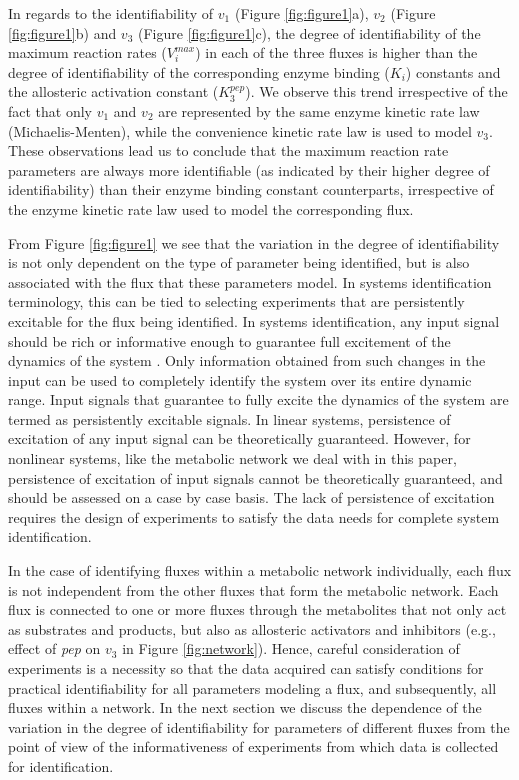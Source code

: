 \documentclass[10pt]{article}
\begin{document}
	In regards to the identifiability of $v_1$ (Figure \ref{fig:figure1}a), $v_2$ (Figure \ref{fig:figure1}b) and $v_3$ (Figure \ref{fig:figure1}c), the degree of identifiability of the maximum reaction rates ($V_i^{max}$) in each of the three fluxes is higher than the degree of identifiability of the corresponding enzyme binding ($K_i$) constants and the allosteric activation constant ($K_3^{pep}$). We observe this trend irrespective of the fact that only  $v_1$ and $v_2$ are represented by the same enzyme kinetic rate law (Michaelis-Menten), while the convenience kinetic rate law is used to model $v_3$. These observations lead us to conclude that the maximum reaction rate parameters are always more identifiable (as indicated by their higher degree of identifiability) than their enzyme binding constant counterparts, irrespective of the enzyme kinetic rate law used to model the corresponding flux.
	
	From Figure \ref{fig:figure1} we see that the variation in the degree of identifiability is not only dependent on the type of parameter being identified, but is also associated with the flux that these parameters model.	In systems identification terminology, this can be tied to selecting experiments that are persistently excitable for the flux being identified. In systems identification, any input signal should be rich or informative enough to guarantee full excitement of the dynamics of the system \parencite{Ljung1994}. Only information obtained from such changes in the input can be used to completely identify the system over its entire dynamic range. Input signals that guarantee to fully excite the dynamics of the system are termed as persistently excitable signals. In linear systems, persistence of excitation of any input signal can be theoretically guaranteed. However, for nonlinear systems, like the metabolic network we deal with in this paper, persistence of excitation of input signals cannot be theoretically guaranteed, and should be assessed on a case by case basis. The lack of persistence of excitation requires the design of experiments to satisfy the data needs for complete system identification. 
	
	In the case of identifying fluxes within a metabolic network individually, each flux is not independent from the other fluxes that form the metabolic network. Each flux is connected to one or more fluxes through the metabolites that not only act as substrates and products, but also as allosteric activators and inhibitors (e.g., effect of \textit{pep} on $v_3$ in Figure \ref{fig:network}). Hence, careful consideration of experiments is a necessity so that the data acquired can satisfy conditions for practical identifiability for all parameters modeling a flux, and subsequently, all fluxes within a network. In the next section we discuss the dependence of the variation in the degree of identifiability for parameters of different fluxes from the point of view of the informativeness of experiments from which data is collected for identification.
	
\end{document}
